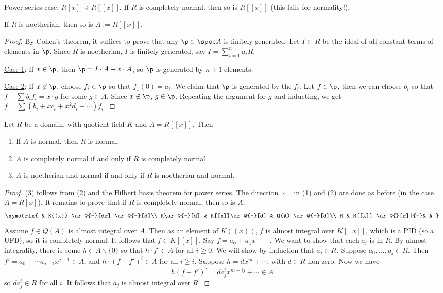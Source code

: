  \medskip
 Power series case: $R[x]\rightsquigarrow R[[x]]$. If $R$ is completely normal, then so
 is $R[[x]]$ (this fails for normality!).
 \begin{theorem}
   If $R$ is noetherian, then so is $A:=R[[x]]$.
 \end{theorem}
 \begin{proof}
   By Cohen's theorem, it suffices to prove that any $\p\in \spec A$ is finitely
   generated. Let $I\subset R$ be the ideal of all constant terms of elements in $\p$. Since
   $R$ is noetherian, $I$ is finitely generated, say $I=\sum_{i=1}^n a_i R$.

   \underline{Case 1}: If $x\in \p$, then $\p=I\cdot A + x\cdot A$, so $\p$ is
   generated by $n+1$ elements.

   \underline{Case 2}: If $x\not\in \p$, choose $f_i\in \p$ so that $f_1(0)=a_i$. We
   claim that $\p$ is generated by the $f_i$. Let $f\in \p$, then we can choose $b_i$ so
   that $f-\sum b_i f_i = x\cdot g$ for some $g\in A$. Since $x\not\in \p$, $g\in \p$.
   Repeating the argument for $g$ and inducting, we get $f=\sum
   (b_i+xc_i+x^2d_i+\cdots)f_i$.
 \end{proof}
 \begin{theorem}
   Let $R$ be a domain, with quotient field $K$ and $A=R[[x]]$. Then
   \begin{enumerate}
     \item If $A$ is normal, then $R$ is normal.
     \item $A$ is completely normal if and only if $R$ is completely normal
     \item $A$ is noetherian and normal if and only if $R$ is noetherian and normal.
   \end{enumerate}
 \end{theorem}
 \begin{proof}
   (3) follows from (2) and the Hilbert basis theorem for power series. The direction
   $\Leftarrow$ in (1) and (2) are done as before (in the case $A=R[x]$). It remains to
   prove that if $R$ is completely normal, then so is $A$.
   \[\xymatrix{
    & K((x)) \ar@{-}[dr] \ar@{-}[d]\\
    K\ar@{-}[d] & K[[x]]\ar@{-}[d] & Q(A) \ar@{-}[d]\\
    R & R[[x]] \ar@{}[r]|{=}& A
   }\]
   Assume $f\in Q(A)$ is almost integral over $A$. Then as an element of $K((x))$, $f$ is
   almost integral over $K[[x]]$, which is a PID (so a UFD), so it is completely normal.
   It follows that $f\in K[[x]]$. Say $f=a_0 + a_1x+ \cdots$. We want to show that each
   $a_i$ is in $R$. By almost integrality, there is some $h\in A\smallsetminus \{0\}$ so
   that $h\cdot f^i\in A$ for all $i\ge 0$. We will show by induction that $a_j\in R$.
   Suppose $a_0,\dots, a_j\in R$. Then $f'=a_0+\cdots a_{j-1}x^{j-1}\in A$, and $h\cdot
   (f-f')^i \in A$ for all $i\ge i$. Suppose $h=dx^m+ \cdots$, with $d\in R$ non-zero.
   Now we have
   \[
    h(f-f')^i = da_j^i x^{m+ij} + \cdots \in A
   \]
   so $da_j^i\in R$ for all $i$. It follows that $a_j$ is almost integral over $R$.
 \end{proof}
